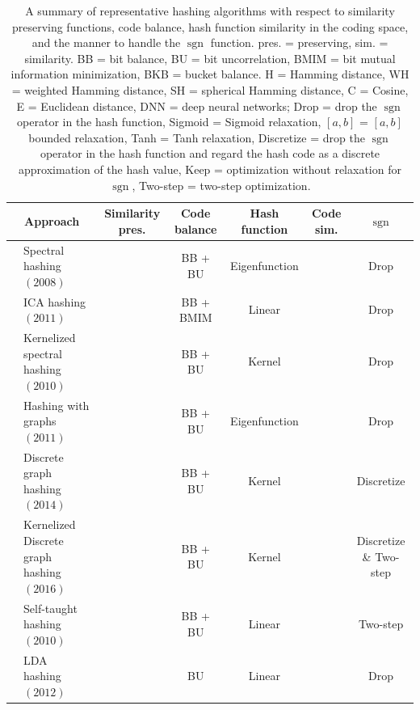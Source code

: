 \documentclass[10pt,journal,compsoc]{IEEEtran}
\begin{document}
\begin{table}[t]
\scriptsize
\caption{A summary of representative hashing algorithms
with respect to similarity preserving functions,
code balance,
hash function
similarity in the coding space,
and the manner to handle the $\operatorname{sgn}$ function.
pres. = preserving,
sim. = similarity.
BB = bit balance, BU = bit uncorrelation, BMIM = bit mutual information minimization,
BKB = bucket balance.
H = Hamming distance,
WH = weighted Hamming distance,
SH = spherical Hamming distance,
C = Cosine,
E = Euclidean distance,
DNN = deep neural networks;
Drop = drop the $\operatorname{sgn}$ operator in the hash function,
Sigmoid = Sigmoid relaxation,
$[a,b]$ = $[a,b]$ bounded relaxation,
Tanh = Tanh relaxation,
Discretize = drop the $\operatorname{sgn}$ operator in the hash function
and regard the hash code as a discrete approximation
of the hash value,
Keep = optimization without relaxation for $\operatorname{sgn}$,
Two-step = two-step optimization.
}
\vspace{-.3cm}
\label{table:summary}
\centering
\begin{tabular}{|@{~}c@{~}|@{~}l@{~}||@{~}c@{~}|@{~}c@{~}|@{~}c@{~}||@{~}c@{~}||@{~}c@{~}|}
\hline
\multicolumn{2}{|c||}{Approach} & Similarity pres. & Code balance  & Hash function & Code sim. & $\operatorname{sgn}$ \\
 \hline
 {\multirow{20}{*}{\rotatebox[origin=c]{0}{Pairwise}}} & Spectral hashing~\cite{WeissTF08} $(2008)$&
 {\multirow{9}{*}{\rotatebox[origin=c]{0}{ $s_{ij}^od_{ij}^h$}}}
 & BB + BU & Eigenfunction &  {\multirow{9}{*}{\rotatebox[origin=c]{0}{H}}}  & Drop\\
& ICA hashing~\cite{HeCRB11} $(2011)$ &   & BB + BMIM   & Linear & & Drop \\
& Kernelized spectral hashing~\cite{HeLC10} $(2010)$&
  & BB + BU   & Kernel & & Drop \\
& Hashing with graphs~\cite{LiuWKC11} $(2011)$& & BB + BU  & Eigenfunction &  & Drop \\
& Discrete graph hashing~\cite{LiuMKC14} $(2014)$&  & BB + BU   & Kernel & & Discretize \\
& Kernelized Discrete graph hashing~\cite{ShiXCZXY16} $(2016)$&  & BB + BU   & Kernel & & Discretize \& Two-step\\
& Self-taught hashing~\cite{ZhangWCL10b} $(2010)$&
  & BB + BU & Linear &  & Two-step\\
& LDA hashing~\cite{StrechaBBF12} $(2012)$ &
  & BU   & Linear & & Drop\\

\end{tabular}
\end{table}
\end{document}
